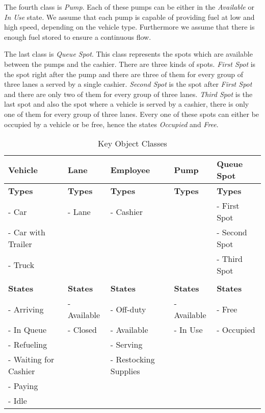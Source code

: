The fourth class is \textit{Pump}.
Each of these pumps can be either in the \textit{Available} or \textit{In Use} state.
We assume that each pump is capable of providing fuel at low and high speed, depending on the vehicle type.
Furthermore we assume that there is enough fuel stored to ensure a continuous flow.

The last class is \textit{Queue Spot}.
This class represents the spots which are available between the pumps and the cashier.
There are three kinds of spots.
\textit{First Spot} is the spot right after the pump and there are three of them for every group of three lanes a served by a single cashier.
\textit{Second  Spot} is the spot after \textit{First Spot} and there are only two of them for every group of three lanes.
\textit{Third Spot} is the last spot and also the spot where a vehicle is served by a cashier, there is only one of them for every group of three lanes.
Every one of these spots can either be occupied by a vehicle or be free, hence the states \textit{Occupied} and \textit{Free}.

\begin{center}
\begin{table}[h]
\begin{tabular}{| l | l | l | l | l |}
\hline
\textbf{Vehicle} & \textbf{Lane} & \textbf{Employee} & \textbf{Pump} & \textbf{Queue Spot}\\
\hline
\textbf{Types} & \textbf{Types} & \textbf{Types} & \textbf{Types} & \textbf{Types}\\
- Car & - Lane & - Cashier& & - First Spot\\
- Car with Trailer & & & & - Second Spot\\
- Truck & & & & - Third Spot\\
& & & & \\
\textbf{States} & \textbf{States} & \textbf{States} & \textbf{States} & \textbf{States}\\
- Arriving & - Available & - Off-duty & - Available & - Free\\
- In Queue & - Closed & - Available & - In Use & - Occupied\\
- Refueling & & - Serving & &\\
- Waiting for Cashier & & - Restocking Supplies & &\\
- Paying & & & &\\
- Idle & & & &\\
\hline
\end{tabular}
\caption{Key Object Classes}
\label{tab:koc}
\end{table}
\end{center}

